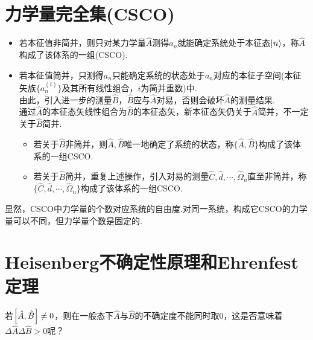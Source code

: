 \section{力学量完全集(CSCO)}
\begin{itemize}
    \item 若本征值非简并，则只对某力学量$\hat{A}$测得$a_n$就能确定系统处于本征态$\ket{n}$，称$\hat{A}$构成了该体系的一组(CSCO).
    \item 若本征值简并，只测得$a_n$只能确定系统的状态处于$a_n$对应的本征子空间(本征矢族$\{a_n^{(i)}\}$及其所有线性组合，$i$为简并重数)中. \\
    由此，引入进一步的测量$\hat{B}$，$\hat{B}$应与$\hat{A}$对易，否则会破坏$\hat{A}$的测量结果.\\
    通过$\hat{A}$的本征态矢线性组合为$\hat{B}$的本征态矢，新本征态矢仍关于$\hat{A}$简并，不一定关于$\hat{B}$简并.
    \begin{itemize}
        \item 若关于$\hat{B}$非简并，则$\hat{A},\hat{B}$唯一地确定了系统的状态，称$\{\hat{A},\hat{B}\}$构成了该体系的一组CSCO.
        \item 若关于$\hat{B}$简并，重复上述操作，引入对易的测量$\hat{C},\hat{d},\cdots,\hat{\Omega}_n$直至非简并，称$\{\hat{C},\hat{d},\cdots,\hat{\Omega}_n\}$构成了该体系的一组CSCO.
    \end{itemize}
\end{itemize}
显然，CSCO中力学量的个数对应系统的自由度.对同一系统，构成它CSCO的力学量可以不同，但力学量个数是固定的.


\section{Heisenberg不确定性原理和Ehrenfest定理}
\begin{question}
    若$\comm{\hat{A}}{\hat{B}} \neq 0$，则在一般态下$\hat{A}$与$\hat{B}$的不确定度不能同时取0，这是否意味着$\Delta\hat{A}\Delta\hat{B}>0$呢？
\end{question}

